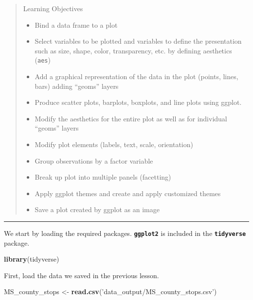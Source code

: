 \documentclass[]{book}
\newenvironment{Shaded}{\begin{snugshade}}{\end{snugshade}}
\newcommand{\KeywordTok}[1]{\textcolor[rgb]{0.13,0.29,0.53}{\textbf{#1}}}
\newcommand{\NormalTok}[1]{#1}
\newcommand{\StringTok}[1]{\textcolor[rgb]{0.31,0.60,0.02}{#1}}
\providecommand{\tightlist}{%
  \setlength{\itemsep}{0pt}\setlength{\parskip}{0pt}}
\begin{document}
\begin{quote}
Learning Objectives

\begin{itemize}
\tightlist
\item
  Bind a data frame to a plot
\item
  Select variables to be plotted and variables to define the presentation such as size, shape, color, transparency, etc. by defining aesthetics (\texttt{aes})
\item
  Add a graphical representation of the data in the plot (points, lines, bars) adding ``geoms'' layers
\item
  Produce scatter plots, barplots, boxplots, and line plots using ggplot.
\item
  Modify the aesthetics for the entire plot as well as for individual ``geoms'' layers
\item
  Modify plot elements (labels, text, scale, orientation)
\item
  Group observations by a factor variable
\item
  Break up plot into multiple panels (facetting)
\item
  Apply ggplot themes and create and apply customized themes
\item
  Save a plot created by ggplot as an image
\end{itemize}
\end{quote}

\begin{center}\rule{0.5\linewidth}{\linethickness}\end{center}

We start by loading the required packages. \textbf{\texttt{ggplot2}} is included in the \textbf{\texttt{tidyverse}} package.

\begin{Shaded}
\begin{Highlighting}[]
\KeywordTok{library}\NormalTok{(tidyverse)}
\end{Highlighting}
\end{Shaded}

First, load the data we saved in the previous lesson.

\begin{Shaded}
\begin{Highlighting}[]
\NormalTok{MS_county_stops <-}\StringTok{ }\KeywordTok{read.csv}\NormalTok{(}\StringTok{'data_output/MS_county_stops.csv'}\NormalTok{)}
\end{Highlighting}
\end{Shaded}
\end{document}

